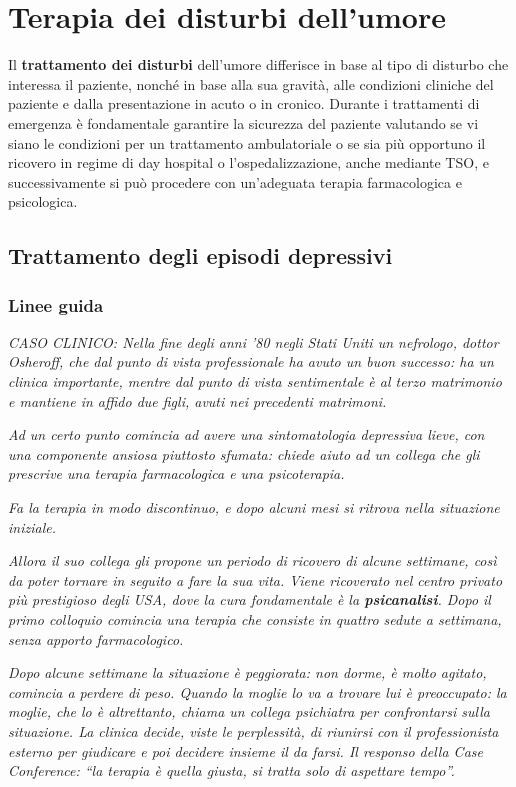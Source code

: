 \section{Terapia dei disturbi dell'umore}

Il \textbf{trattamento dei disturbi} dell'umore differisce in base al
tipo di disturbo che interessa il paziente, nonché in base alla sua
gravità, alle condizioni cliniche del paziente e dalla presentazione in
acuto o in cronico. Durante i trattamenti di emergenza è fondamentale
garantire la sicurezza del paziente valutando se vi siano le condizioni
per un trattamento ambulatoriale o se sia più opportuno il ricovero in
regime di day hospital o l'ospedalizzazione, anche mediante TSO, e
successivamente si può procedere con un'adeguata terapia farmacologica e
psicologica.

\subsection{Trattamento degli episodi depressivi}

\subsubsection{Linee guida}

\emph{\emph{CASO CLINICO: Nella fine degli anni '80 negli Stati Uniti un
nefrologo, dottor Osheroff, che dal punto di vista professionale ha
avuto un buon successo: ha un clinica importante, mentre dal punto di
vista sentimentale è al terzo matrimonio e mantiene in affido due figli,
avuti nei precedenti matrimoni.}}

\emph{Ad un certo punto comincia ad avere una sintomatologia depressiva
lieve, con una componente ansiosa piuttosto sfumata: chiede aiuto ad un
collega che gli prescrive una terapia farmacologica e una psicoterapia.
}

\emph{Fa la terapia in modo discontinuo, e dopo alcuni mesi si ritrova
nella situazione iniziale.}

\emph{Allora il suo collega gli propone un periodo di ricovero di alcune
settimane, così da poter tornare in seguito a fare la sua vita. Viene
ricoverato nel centro privato più prestigioso degli USA, dove la cura
fondamentale è la \textbf{psicanalisi}. Dopo il primo colloquio comincia
una terapia che consiste in quattro sedute a settimana, senza apporto
farmacologico.}

\emph{Dopo alcune settimane la situazione è peggiorata: non dorme, è
molto agitato, comincia a perdere di peso. Quando la moglie lo va a
trovare lui è preoccupato: la moglie, che lo è altrettanto, chiama un
collega psichiatra per confrontarsi sulla situazione. La clinica decide,
viste le perplessità, di riunirsi con il professionista esterno per
giudicare e poi decidere insieme il da farsi. Il responso della Case
Conference: ``la terapia è quella giusta, si tratta solo di aspettare
tempo''.}

